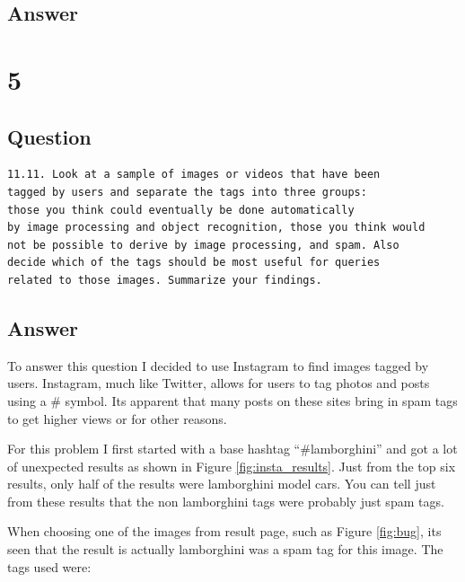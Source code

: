 \documentclass[letterpaper,11pt]{article}
\begin{document}
\begin{verbatim}

\end{verbatim}

\subsection*{Answer}


\clearpage


\section*{5}

\subsection*{Question}

\begin{verbatim}
11.11. Look at a sample of images or videos that have been 
tagged by users and separate the tags into three groups: 
those you think could eventually be done automatically
by image processing and object recognition, those you think would
not be possible to derive by image processing, and spam. Also 
decide which of the tags should be most useful for queries 
related to those images. Summarize your findings.
\end{verbatim}

\subsection*{Answer}

To answer this question I decided to use Instagram to find images tagged by users.
Instagram, much like Twitter, allows for users to tag photos and posts using a \# symbol.
Its apparent that many posts on these sites bring in spam tags to get higher views or for other reasons.

For this problem I first started with a base hashtag ``\#lamborghini'' and got a lot of unexpected results as shown in Figure \ref{fig:insta_results}.
Just from the top six results, only half of the results were lamborghini model cars.
You can tell just from these results that the non lamborghini tags were probably just spam tags.

When choosing one of the images from result page, such as Figure \ref{fig:bug}, its seen that the result is actually lamborghini was a spam tag for this image.
The tags used were:
\end{document}
